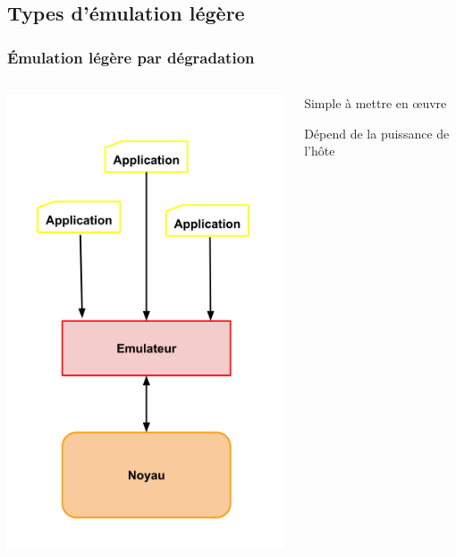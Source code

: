 \documentclass[10.5pt]{beamer}
\begin{document}
\subsection{Types d'émulation légère}
\begin{frame}{\subsecname}
  \frametitle{Émulation légère par dégradation}
  \begin{columns}[c]
    \begin{column}{3cm}
        \includegraphics[scale=0.3]{Pictures/png/Virtualisation_limitation}    
    \end{column}
    \begin{column}{6cm}
        Simple à mettre en \oe uvre
        
        Dépend de la puissance de l'hôte

    \end{column}
  \end{columns}
\end{frame}
\end{document}
